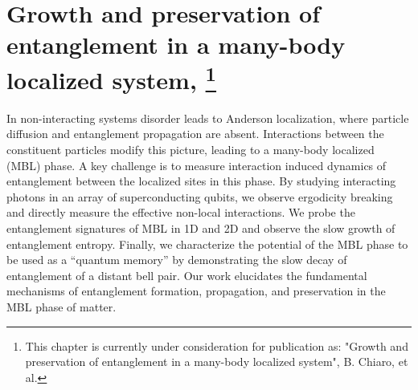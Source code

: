 %
\chapter[Growth and preservation of entanglement in a many-body localized system]{Growth and preservation of entanglement in a many-body localized system,
\footnote{This chapter is currently under consideration for publication as: "Growth and preservation of entanglement in a many-body localized system", B. Chiaro, et al.}}
\label{ch:MBL}


In non-interacting systems disorder leads to Anderson localization, where particle diffusion and entanglement propagation are absent.
Interactions between the constituent particles modify this picture, leading to a many-body localized (MBL) phase.
A key challenge is to measure interaction induced dynamics of entanglement between the localized sites in this phase.
By studying interacting photons in an array of superconducting qubits, we observe ergodicity breaking and directly measure the effective non-local interactions.
We probe the entanglement signatures of MBL in 1D and 2D and observe the slow growth of entanglement entropy.
Finally, we characterize the potential of the MBL phase to be used as a “quantum memory” by demonstrating the slow decay of entanglement of a distant bell pair.
Our work elucidates the fundamental mechanisms of entanglement formation, propagation, and preservation in the MBL phase of matter.

